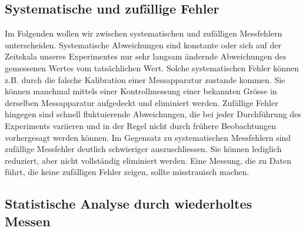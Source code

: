 


\subsection{Systematische und zufällige Fehler}

Im Folgenden wollen wir zwischen systematischen und zufälligen Messfehlern unterscheiden.  Systematische Abweichungen sind konstante oder sich auf der Zeitskala unseres Experimentes nur sehr langsam ändernde Abweichungen des gemessenen Wertes vom tatsächlichen Wert. Solche systematischen Fehler können z.B. durch die falsche Kalibration einer Messapparatur zustande kommen. Sie können manchmal mittels einer Kontrollmessung einer bekannten Grösse in derselben Messapparatur aufgedeckt und eliminiert werden. Zufällige Fehler hingegen sind schnell fluktuierende Abweichungen, die bei jeder Durchführung des Experiments variieren und in der Regel nicht durch frühere Beobachtungen vorhergesagt werden können. Im Gegensatz zu systematischen Messfehlern sind zufällige Messfehler deutlich schwieriger auszuschliessen. Sie können lediglich reduziert, aber nicht vollständig eliminiert werden. Eine Messung, die zu Daten führt, die keine zufälligen Fehler zeigen, sollte misstrauisch machen.

\subsection{Statistische Analyse durch wiederholtes Messen} 

